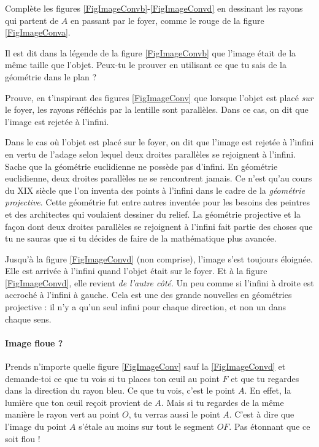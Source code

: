 \begin{exercice}
Complète les figures \ref{FigImageConvb}-\ref{FigImageConvd} en dessinant les rayons qui partent de $A$ en passant par le foyer, comme le rouge de la figure \ref{FigImageConva}.
\end{exercice}

\begin{exercice}
Il est dit dans la légende de la figure \ref{FigImageConvb} que l'image était de la même taille que l'objet. Peux-tu le prouver en utilisant ce que tu sais de la géométrie dans le plan ?
\end{exercice}

\begin{exercice}
Prouve, en t'inspirant des figures \ref{FigImageConv} que lorsque l'objet est placé \emph{sur} le foyer, les rayons réfléchis par la lentille sont parallèles. Dans ce cas, on dit que l'image est rejetée à l'infini.
\end{exercice}

\begin{remark}
Dans le cas où l'objet est placé sur le foyer, on dit que l'image est rejetée à l'infini en vertu de l'adage selon lequel \og deux droites parallèles se rejoignent à l'infini\fg{}. Sache que la géométrie euclidienne ne possède pas d'infini. En géométrie euclidienne, deux droites parallèles ne se rencontrent jamais. Ce n'est qu'au cours du XIX\ieme{} siècle que l'on inventa des points à l'infini dans le cadre de la \emph{géométrie projective}. Cette géométrie fut entre autres inventée pour les besoins des peintres et des architectes qui voulaient dessiner du relief. La géométrie projective et la façon dont deux droites parallèles se rejoignent à l'infini fait partie des choses que tu ne sauras que si tu décides de faire de la mathématique plus avancée.

Jusqu'à la figure \ref{FigImageConvd} (non comprise), l'image s'est toujours éloignée. Elle est arrivée à l'infini quand l'objet était sur le foyer. Et à la figure \ref{FigImageConvd}, elle revient \emph{de l'autre côté}. Un peu comme si l'infini à droite est accroché à l'infini à gauche. Cela est une des grande nouvelles en géométries projective : il n'y a qu'un seul infini pour chaque direction, et non un dans chaque sens.
\end{remark}

\paragraph{Image floue ?} Prends n'importe quelle figure \ref{FigImageConv} sauf la \ref{FigImageConvd} et demande-toi ce que tu vois si tu places ton \oe uil au point $F$ et que tu regardes dans la direction du rayon bleu. Ce que tu vois, c'est le point $A$. En effet, la lumière que ton \oe uil reçoit provient de $A$. Mais si tu regardes de la même manière le rayon vert au point $O$, tu verras aussi le point $A$. C'est à dire que l'image du point $A$ s'étale au moins sur tout le segment $OF$. Pas étonnant que ce soit flou !

